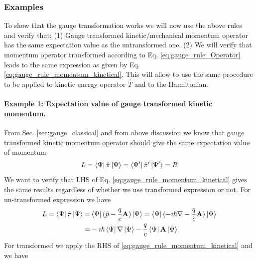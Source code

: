 \documentclass[11pt]{article}
\begin{document}
\subsubsection*{Examples}
To show that the gauge transformation  works  we will now  use the above rules and verify that:  (1) Gauge transformed   kinetic/mechanical momentum operator has the same expectation  value   as the untransformed one. (2) We will verify that  momentum operator transformed  according to  Eq. \ref{eq:gauge_rule_Operator} leads to the same  expression as given by Eq. \ref{eq:gauge_rule_momentum_kinetical}. This will allow to use the same procedure to  be applied to kinetic energy operator  $\hat T$ and to the Hamiltonian.

\paragraph{Example 1: Expectation value of gauge transformed kinetic momentum.}
From  Sec. \ref{sec:gauge_classical} and from above discussion we know that  gauge transformed   kinetic momentum operator should  give the same expectation value of momentum 
\begin{align*}
    L=\bra{\Psi} \hat \pi \ket{\Psi} =    \bra{\Psi'} \hat \pi' \ket{\Psi'} =R
\end{align*}
We want  to verify that LHS of Eq.  \ref{eq:gauge_rule_momentum_kinetical} gives the same results regardless of  whether  we use transformed  expression or  not.
For un-transformed expression we have
\begin{align}
\nonumber    L= \bra{\Psi} \hat \pi \ket{\Psi} =& \bra{\Psi} (\hat p - \frac{q}{c} \vb A) \ket{\Psi} 
    = \bra{\Psi} (-\imath \hbar \nabla - \frac{q}{c} \vb A) \ket{\Psi} \\
\label{eq:ex_1}    =&-\imath \hbar   \bra{\Psi} \nabla\ket{\Psi}  - \frac{q}{c} \bra{\Psi}\vb A \ket{\Psi} 
\end{align}
For transformed  we apply the RHS of  \ref{eq:gauge_rule_momentum_kinetical} and we  have
\end{document}
